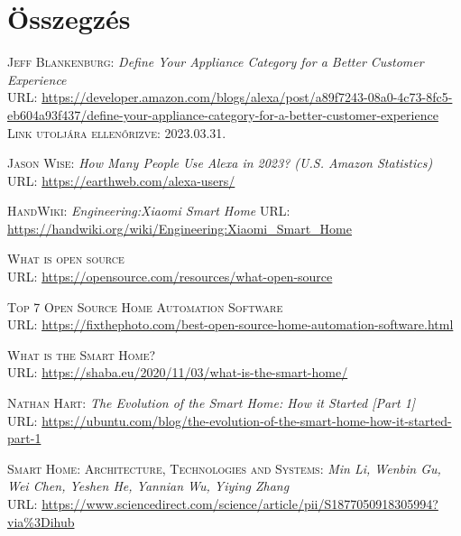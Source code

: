 \documentclass[
]{thesis-ekf}
\theoremstyle{definition}
\theoremstyle{remark}
\begin{document}
	
	\chapter*{Összegzés}
	
	\begin{thebibliography}{20}
		
		\textsc{Jeff Blankenburg}: \emph{Define Your Appliance Category for a Better Customer Experience}\\
		\textsc{URL:} \url{https://developer.amazon.com/blogs/alexa/post/a89f7243-08a0-4c73-8fc5-eb604a93f437/define-your-appliance-category-for-a-better-customer-experience}
		\textsc{Link utoljára ellenőrizve:} 2023.03.31.
		
		\textsc{Jason Wise}: \emph{How Many People Use Alexa in 2023? (U.S. Amazon Statistics)} 
		\textsc{URL:} \url{https://earthweb.com/alexa-users/}
		
		\textsc{HandWiki}: \emph{Engineering:Xiaomi Smart Home}
		\textsc{URL:} \url{https://handwiki.org/wiki/Engineering:Xiaomi_Smart_Home}
		
		\textsc{What is open source}\\
		\textsc{URL:} \url{https://opensource.com/resources/what-open-source}
		
		\textsc{Top 7 Open Source Home Automation Software}\\
		\textsc{URL:} \url{https://fixthephoto.com/best-open-source-home-automation-software.html}
		
		\textsc{What is the Smart Home?}\\
		\textsc{URL:} \url{https://shaba.eu/2020/11/03/what-is-the-smart-home/}
		
		\textsc{Nathan Hart}: \emph{The Evolution of the Smart Home: How it Started [Part 1]}\\
		\textsc{URL}: \url{https://ubuntu.com/blog/the-evolution-of-the-smart-home-how-it-started-part-1}
		
		\textsc{Smart Home: Architecture, Technologies and Systems}: \emph{Min Li, Wenbin Gu, Wei Chen, Yeshen He, Yannian Wu, Yiying Zhang}\\
		\textsc{URL:} \url{https://www.sciencedirect.com/science/article/pii/S1877050918305994?via%3Dihub}
		

\end{thebibliography}
\end{document}
